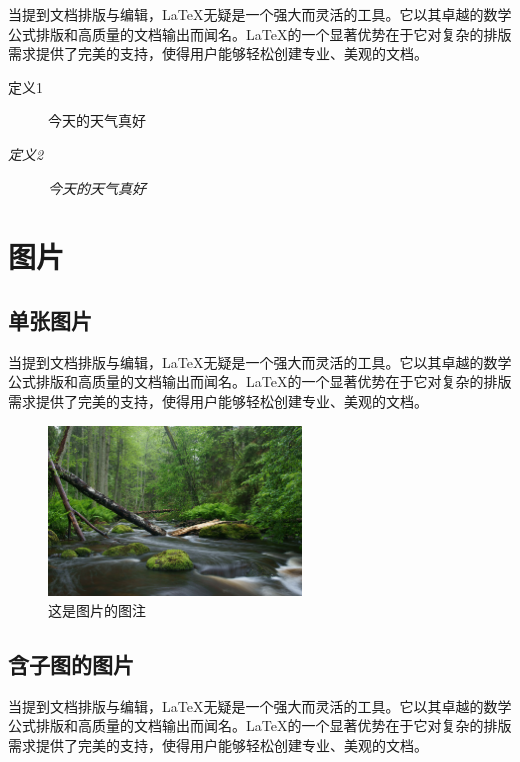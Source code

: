\documentclass[AutoFakeBold,a4paper]{ctexart}
\begin{document}
当提到文档排版与编辑，LaTeX无疑是一个强大而灵活的工具。它以其卓越的数学公式排版和高质量的文档输出而闻名。LaTeX的一个显著优势在于它对复杂的排版需求提供了完美的支持，使得用户能够轻松创建专业、美观的文档。

\begin{description}
    \item[定义1] 今天的天气真好
    \item[\emph{定义2}] \emph{今天的天气真好}
\end{description}


\section{图片}

\subsection{单张图片}


当提到文档排版与编辑，LaTeX无疑是一个强大而灵活的工具。它以其卓越的数学公式排版和高质量的文档输出而闻名。LaTeX的一个显著优势在于它对复杂的排版需求提供了完美的支持，使得用户能够轻松创建专业、美观的文档。

\begin{figure}[htbp]
    \centering
    \includegraphics[width=0.6\textwidth]{Graph/test}
    \caption{这是图片的图注}
    \label{fig1}
\end{figure}


\subsection{含子图的图片}


当提到文档排版与编辑，LaTeX无疑是一个强大而灵活的工具。它以其卓越的数学公式排版和高质量的文档输出而闻名。LaTeX的一个显著优势在于它对复杂的排版需求提供了完美的支持，使得用户能够轻松创建专业、美观的文档。
\end{document}

